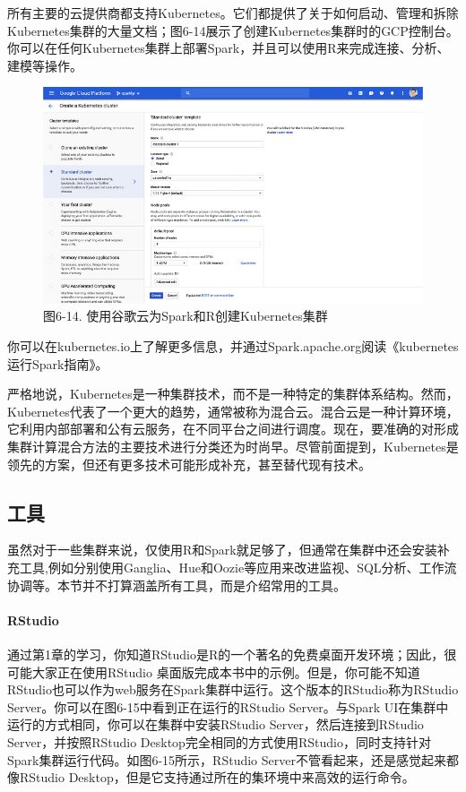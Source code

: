 \documentclass[
]{article}
\begin{document}
所有主要的云提供商都支持Kubernetes。它们都提供了关于如何启动、管理和拆除Kubernetes集群的大量文档；图6-14展示了创建Kubernetes集群时的GCP控制台。你可以在任何Kubernetes集群上部署Spark，并且可以使用R来完成连接、分析、建模等操作。

\begin{figure}
\centering
\includegraphics{figures/6_14.png}
\caption{图6-14. 使用谷歌云为Spark和R创建Kubernetes集群}
\end{figure}

你可以在kubernetes.io上了解更多信息，并通过Spark.apache.org阅读《kubernetes运行Spark指南》。

严格地说，Kubernetes是一种集群技术，而不是一种特定的集群体系结构。然而，Kubernetes代表了一个更大的趋势，通常被称为混合云。混合云是一种计算环境，它利用内部部署和公有云服务，在不同平台之间进行调度。现在，要准确的对形成集群计算混合方法的主要技术进行分类还为时尚早。尽管前面提到，Kubernetes是领先的方案，但还有更多技术可能形成补充，甚至替代现有技术。

\hypertarget{ux5de5ux5177}{%
\subsection{工具}\label{ux5de5ux5177}}

虽然对于一些集群来说，仅使用R和Spark就足够了，但通常在集群中还会安装补充工具,例如分别使用Ganglia、Hue和Oozie等应用来改进监视、SQL分析、工作流协调等。本节并不打算涵盖所有工具，而是介绍常用的工具。

\hypertarget{rstudio}{%
\paragraph{RStudio}\label{rstudio}}

通过第1章的学习，你知道RStudio是R的一个著名的免费桌面开发环境；因此，很可能大家正在使用RStudio
桌面版完成本书中的示例。但是，你可能不知道RStudio也可以作为web服务在Spark集群中运行。这个版本的RStudio称为RStudio
Server。你可以在图6-15中看到正在运行的RStudio Server。与Spark
UI在集群中运行的方式相同，你可以在集群中安装RStudio
Server，然后连接到RStudio Server，并按照RStudio
Desktop完全相同的方式使用RStudio，同时支持针对Spark集群运行代码。如图6-15所示，RStudio
Server不管看起来，还是感觉起来都像RStudio
Desktop，但是它支持通过所在的集环境中来高效的运行命令。
\end{document}
